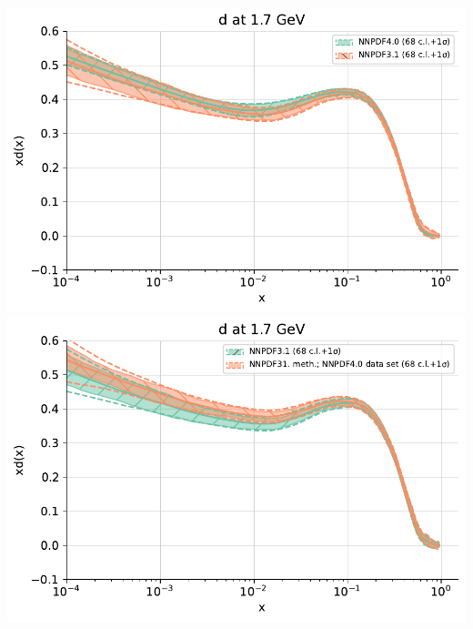 \documentclass{beamer}
\begin{document}
\begin{frame}
\begin{columns}[c]
\begin{column}{0.5\textwidth}
\begin{overlayarea}{\columnwidth}{4cm}
{     \includegraphics[width=\columnwidth]{plots/d_fit_1}\\    
    }
    {
     \centering
     \includegraphics[width=\columnwidth]{plots/d_fit_2}\\    
    }
   \end{overlayarea}   
  \end{column} 
 \end{columns}
 \begin{columns}[c]
  \begin{column}{0.5\textwidth}
   \begin{overlayarea}{\columnwidth}{4cm}
    {
     \centering
}
\end{overlayarea}
\end{column}
\end{columns}
\end{frame}
\end{document}
